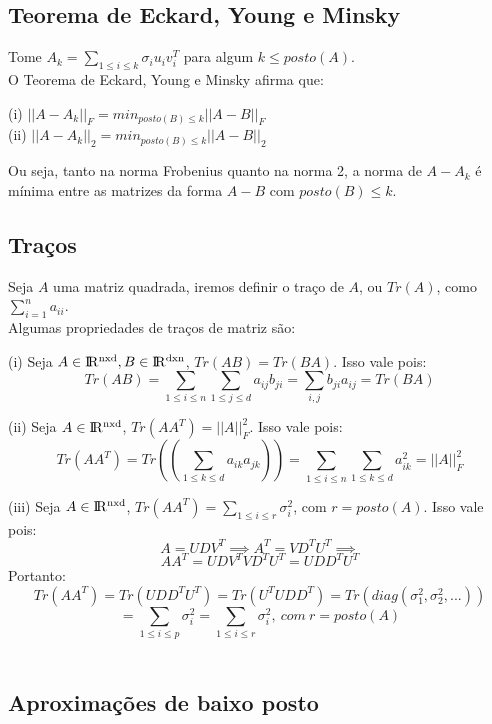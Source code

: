 \subsection{Teorema de Eckard, Young e Minsky}
\[\]
Tome $A_k = \sum_{1\leq i \leq k} \sigma_i u_i v_i^T $ para algum $k\leq posto(A)$.\\

O Teorema de Eckard, Young e Minsky afirma que:\

\begin{enumerate}
(i) $ ||A-A_k||_F= min_{posto(B) \leq k} ||A-B||_F $\\
(ii) $ ||A-A_k||_2 = min_{posto(B) \leq k} ||A-B||_2 $
\end{enumerate}

Ou seja, tanto na norma Frobenius quanto na norma 2, a norma de $A-A_k$ é mínima entre as matrizes da forma $A-B$ com $posto(B) \leq k$.

\subsection{Traços}

Seja $A$ uma matriz quadrada, iremos definir o traço de $A$, ou $Tr(A)$, como $\sum_{i=1}^n a_{ii}$.
\[\]
Algumas propriedades de traços de matriz são:

\begin{enumerate}
(i) Seja $A \in   {\rm I\!R^{nxd}}, B \in   {\rm I\!R^{dxn}} $, $Tr(AB)=Tr(BA)$. Isso vale pois:
\[Tr(AB) =  \sum_{1 \leq i \leq n} \sum_{1\leq j \leq d} a_{ij}b_{ji} = \sum_{i,j} b_{ji} a_{ij} = Tr(BA)\]

(ii) Seja $A \in  {\rm I\!R^{nxd}} $, $ Tr(AA^T)= ||A||_F^2$. Isso vale pois:
\[ Tr(AA^T) = Tr((\sum_{1\leq k \leq d} a_{ik} a_{jk} )) = \sum_{1 \leq i \leq n} \sum_{1\leq k \leq d} a_{ik}^2 = ||A||_F^2 \]

(iii) Seja $A \in  {\rm I\!R^{nxd}} $, $ Tr(AA^T)= \sum_{1\leq i \leq r} \sigma_i^2$, com $r = posto(A)$. Isso vale pois:
\[A = UDV^T \implies A^T = VD^T U^T \implies\]
\[AA^T = UDV^T VD^T U^T = UDD^T U^T\]
Portanto:
\[Tr(AA^T) = Tr(UDD^T U^T) = Tr(U^T UDD^T) = Tr(diag(\sigma_1^2, \sigma_2^2 , ...))\]
\[= \sum_{1\leq i \leq p} \sigma_i^2 = \sum_{1\leq i \leq r} \sigma_i^2, \ com \ r = posto(A) \]\\
\end{enumerate}

\subsection{Aproximações de baixo posto}

